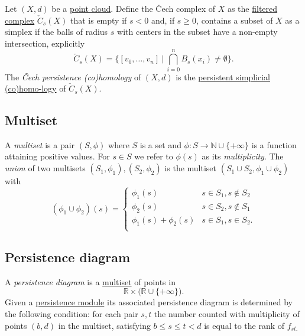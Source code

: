 \documentclass{amsart}
\begin{document}
	Let $(X, d)$ be a \hyperref[finite metric spaces and point clouds]{point cloud}. Define the \v{C}ech complex of $X$ as the \hyperref[filtered complex]{filtered complex} $\check{C}_s(X)$ that is empty if $s<0$ and, if $s \geq 0$, contains a subset of $X$ as a simplex if the balls of radius $s$ with centers in the subset have a non-empty intersection, explicitly
	\begin{equation*}
	\check{C}_s(X) = \Big\{ [v_0,\dots,v_n]\ \Big|\ \bigcap_{i=0}^n B_s(x_i) \neq \emptyset \Big\}.
	\end{equation*}
	The \textit{\v Cech persistence (co)homology} of $(X,d)$ is the \hyperref[persistent simplicial (co)homology]{persistent simplicial (co)homo-logy} of $\check{C}_s(X)$.
	
	\subsection*{Multiset} \label{multiset}
	
	A \textit{multiset} is a pair $(S, \phi)$ where $S$ is a set and $\phi : S \to \mathbb N \cup \{+\infty\}$ is a function attaining positive values. For $s \in S$ we refer to $\phi(s)$ as its \textit{multiplicity}. The \textit{union} of two multisets $(S_1, \phi_1), (S_2, \phi_2)$ is the multiset $(S_1 \cup S_2, \phi_1 \cup \phi_2)$ with
	\begin{equation*}
	(\phi_1 \cup \phi_2)(s) = 
	\begin{cases}
	\phi_1(s) & s \in S_1, s \not\in S_2 \\
	\phi_2(s) & s \in S_2, s \not\in S_1 \\
	\phi_1(s) + \phi_2(s) & s \in S_1, s \in S_2. \\
	\end{cases}
	\end{equation*}
	
	\subsection*{Persistence diagram} \label{persistence diagram}
	
	A \textit{persistence diagram} is a \hyperref[multiset]{multiset} of points in
	\begin{equation*}
	\mathbb R \times \big( \mathbb{R} \cup \{+\infty\} \big).
	\end{equation*}	
	Given a \hyperref[persistence module]{persistence module} its associated persistence diagram is determined by the following condition: for each pair $s,t$ the number counted with multiplicity of points $(b,d)$ in the multiset, satisfying $b \leq s \leq t < d$ is equal to the rank of $f_{st.}$
	
\end{document}
